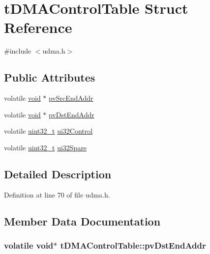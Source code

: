 \hypertarget{structt_d_m_a_control_table}{}\section{t\+D\+M\+A\+Control\+Table Struct Reference}
\label{structt_d_m_a_control_table}


{\ttfamily \#include $<$udma.\+h$>$}

\subsection*{Public Attributes}
\begin{DoxyCompactItemize}
\item 
volatile \hyperlink{usb__devapi_8h_afabf60e7f57651d6d595a02c75f07cd0}{void} $\ast$ \hyperlink{structt_d_m_a_control_table_a211c562f9f14e09e84cd8c215e69c7a5}{pv\+Src\+End\+Addr}
\item 
volatile \hyperlink{usb__devapi_8h_afabf60e7f57651d6d595a02c75f07cd0}{void} $\ast$ \hyperlink{structt_d_m_a_control_table_a7346504231dcaa51e6da47bb82256c8f}{pv\+Dst\+End\+Addr}
\item 
volatile \hyperlink{_p_e___types_8h_a33594304e786b158f3fb30289278f5af}{uint32\+\_\+t} \hyperlink{structt_d_m_a_control_table_a408694668c5a110a70841dcdf90bed3b}{ui32\+Control}
\item 
volatile \hyperlink{_p_e___types_8h_a33594304e786b158f3fb30289278f5af}{uint32\+\_\+t} \hyperlink{structt_d_m_a_control_table_a4f63f0ed18f20f7b81146ad194a259f9}{ui32\+Spare}
\end{DoxyCompactItemize}


\subsection{Detailed Description}


Definition at line 70 of file udma.\+h.



\subsection{Member Data Documentation}
\subsubsection[{\texorpdfstring{pv\+Dst\+End\+Addr}{pvDstEndAddr}}]{\setlength{\rightskip}{0pt plus 5cm}volatile {\bf void}$\ast$ t\+D\+M\+A\+Control\+Table\+::pv\+Dst\+End\+Addr}\hypertarget{structt_d_m_a_control_table_a7346504231dcaa51e6da47bb82256c8f}{}\label{structt_d_m_a_control_table_a7346504231dcaa51e6da47bb82256c8f}


